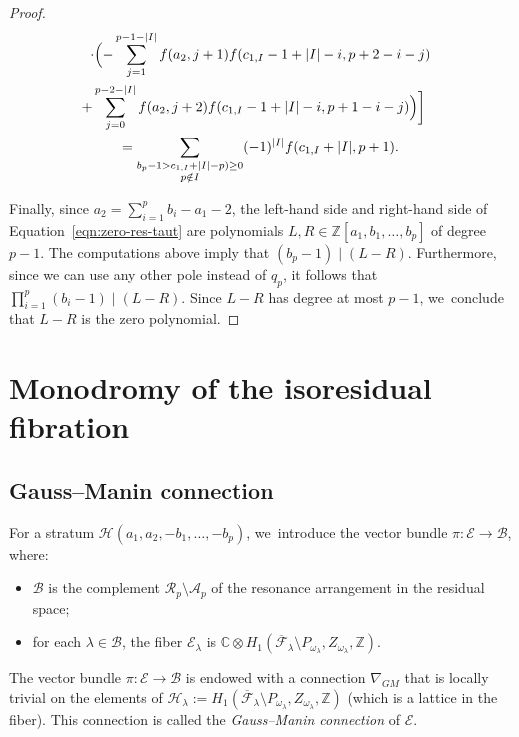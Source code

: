 \documentclass[JEP,XML,SOM,Unicode,NoFloatCountersInSection,published]{cedram}
\newcommand\ZZ{{\mathbb Z}}
\newcommand\calH{{\mathcal H}}
\theoremstyle{definition}
\begin{document}
\begin{proof}
\begin{minipage}{\textwidth}
\begin{multline*}
\cdot\Bigl(-\sum_{j=1}^{p-1-|I|}f(a_2,j+1)f(c_{1,I}-1+|I|-i,p+2-i-j)\\
\shoveright{+\sum_{j=0}^{p-2-|I|}f(a_2,j+2)f(c_{1,I}-1+|I|-i,p+1-i-j)\Bigr)\biggr]}\\
=\sum_{\substack{b_p-1>c_{1,I}+|I|-p)\geq 0\\ p\notin I}}(-1)^{|I|}f(c_{1,I}+|I|,p+1).
\end{multline*}
\end{minipage}
\par\smallskip\noindent
Finally, since $a_2=\sum_{i=1}^p b_i -a_1-2$, the left-hand side and right-hand side of Equation~\eqref{eqn:zero-res-taut} are polynomials $L,R\in \mathbb{Z}[a_1,b_1,\ldots,b_p]$ of degree $p-1$. The computations above imply that $(b_p-1) \mid (L-R)$. Furthermore, since we can use any other pole instead of $q_p$, it follows that $\prod_{i=1}^p(b_i-1)\mid (L-R)$. Since $L-R$ has degree at most $p-1$, we~conclude that $L-R$ is the zero polynomial.
\end{proof}

\section{Monodromy of the isoresidual fibration}\label{sec:GaussManin}

\subsection{Gauss--Manin connection}

For a stratum $\mathcal{H}(a_{1},a_{2},-b_{1},\dots,-b_{p})$, we~introduce the vector bundle $\pi\colon\mathcal{E} \to \mathcal{B}$, where:
\begin{itemize}
\item $\mathcal{B}$ is the complement $\mathcal{R}_{p} \setminus \mathcal{A}_{p}$ of the resonance arrangement in the residual space;
\item for each $\lambda \in \mathcal{B}$, the fiber $\mathcal{E}_{\lambda}$ is $\mathbb{C} \otimes H_{1}(\overline{\mathcal{F}}_{\lambda} \setminus P_{\omega_{\lambda}}, Z_{\omega_{\lambda}},\ZZ)$.
\end{itemize}
The vector bundle $\pi\colon\mathcal{E} \to \mathcal{B}$ is endowed with a connection $\nabla_{GM}$ that is locally trivial on the elements of $\calH_{\lambda}:= H_{1}(\overline{\mathcal{F}}_{\lambda} \setminus P_{\omega_{\lambda}}, Z_{\omega_{\lambda}},\ZZ)$ (which is a lattice in the fiber). This connection is called the \textit{Gauss--Manin connection} of $\mathcal{E} $.
\end{document}
